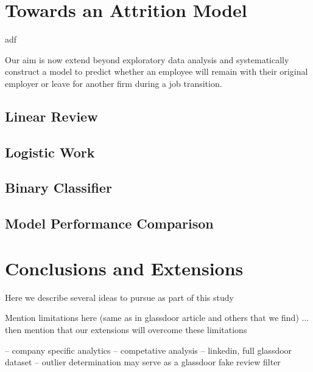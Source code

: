 \documentclass[10pt]{article}
\begin{document}
\section{Towards an Attrition Model}

adf

Our aim is now extend beyond exploratory data analysis and systematically construct 
a model to predict whether an employee will remain with their original employer or 
leave for another firm during a job transition.

\subsection{Linear Review}


\subsection{Logistic Work}


\subsection{Binary Classifier}

\subsection{Model Performance Comparison}

\section{Conclusions and Extensions}


Here we describe several ideas to pursue as part of this study

Mention limitations here (same as in glassdoor article and others that we find) ... then 
mention that our extensions will overcome these limitations 

-- company specific analytics
-- competative analysis
-- linkedin, full glassdoor dataset 
-- outlier determination may serve as a glassdoor fake review filter 


\end{document}
